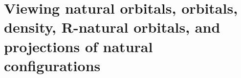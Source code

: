 \documentclass[10pt,leqno, oneside]{book}
\begin{document}

\section{Viewing natural orbitals, orbitals, density, R-natural orbitals, and projections of natural configurations \label{viewsect}}
\end{document}

